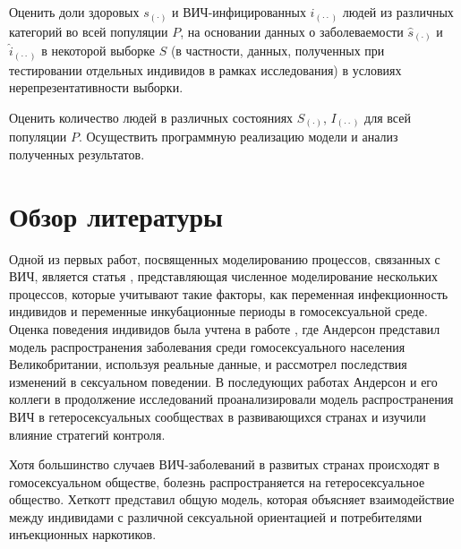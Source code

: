 \documentclass[a4paper]{report}
\begin{document}
	Оценить доли здоровых $s_{(\cdot)}$ и ВИЧ-инфицированных $i_{(\cdot \cdot)}$ людей из различных категорий во всей популяции $P$, на основании данных о заболеваемости $\hat{s}_{(\cdot)}$ и $\hat{i}_{(\cdot \cdot)}$ в некоторой выборке $S$ (в частности, данных, полученных при тестировании отдельных индивидов в рамках исследования) в условиях нерепрезентативности выборки.
	
	Оценить количество людей в различных состояниях $S_{(\cdot)}$, $I_{(\cdot \cdot)}$ для всей популяции $P$.
	Осуществить программную реализацию модели и анализ полученных результатов.

	
	
	\chapter*{Обзор литературы}
	
	Одной из первых работ, посвященных моделированию процессов, связанных с ВИЧ, является статья \cite{link3}, представляющая численное моделирование нескольких процессов, которые учитывают такие факторы, как переменная инфекционность индивидов и переменные инкубационные периоды в гомосексуальной среде.
	Оценка поведения индивидов была учтена в работе \cite{link4}, где Андерсон представил модель распространения заболевания среди гомосексуального населения Великобритании, используя реальные данные, и рассмотрел последствия изменений в сексуальном поведении. В последующих работах \cite{link5, link6} Андерсон и его коллеги в продолжение исследований проанализировали модель распространения ВИЧ в гетеросексуальных сообществах в развивающихся странах и изучили влияние стратегий контроля.
	 
	Хотя большинство случаев ВИЧ-заболеваний в развитых странах происходят в гомосексуальном обществе, болезнь распространяется на гетеросексуальное общество. Хеткотт \cite{link7} представил общую модель, которая объясняет взаимодействие между индивидами с различной сексуальной ориентацией и потребителями инъекционных наркотиков.
	
\end{document}
